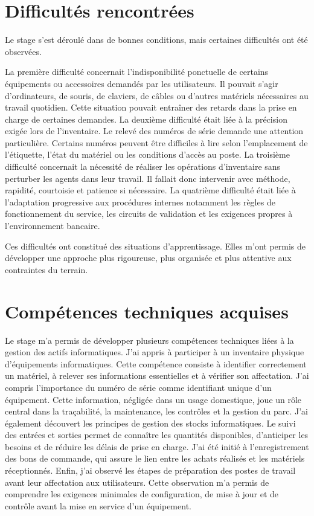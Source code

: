\documentclass[12pt,a4paper]{report}
\begin{document}
\section{Difficultés rencontrées}

Le stage s'est déroulé dans de bonnes conditions, mais certaines difficultés ont été observées.

La première difficulté concernait l'indisponibilité ponctuelle de certains équipements ou accessoires demandés par les utilisateurs. Il pouvait s'agir d'ordinateurs, de souris, de claviers, de câbles ou d'autres matériels nécessaires au travail quotidien. Cette situation pouvait entraîner des retards dans la prise en charge de certaines demandes.
La deuxième difficulté était liée à la précision exigée lors de l'inventaire. Le relevé des numéros de série demande une attention particulière. Certains numéros peuvent être difficiles à lire selon l'emplacement de l'étiquette, l'état du matériel ou les conditions d'accès au poste.
La troisième difficulté concernait la nécessité de réaliser les opérations d'inventaire sans perturber les agents dans leur travail. Il fallait donc intervenir avec méthode, rapidité, courtoisie et patience si nécessaire.
La quatrième difficulté était liée à l'adaptation progressive aux procédures internes notamment les règles de fonctionnement du service, les circuits de validation et les exigences propres à l'environnement bancaire.

Ces difficultés ont constitué des situations d'apprentissage. Elles m'ont permis de développer une approche plus rigoureuse, plus organisée et plus attentive aux contraintes du terrain.

\section{Compétences techniques acquises}

Le stage m'a permis de développer plusieurs compétences techniques liées à la gestion des actifs informatiques.
J'ai appris à participer à un inventaire physique d'équipements informatiques. Cette compétence consiste à identifier correctement un matériel, à relever ses informations essentielles et à vérifier son affectation.
J'ai compris l'importance du numéro de série comme identifiant unique d'un équipement. Cette information, négligée dans un usage domestique, joue un rôle central dans la traçabilité, la maintenance, les contrôles et la gestion du parc.
J'ai également découvert les principes de gestion des stocks informatiques. Le suivi des entrées et sorties permet de connaître les quantités disponibles, d'anticiper les besoins et de réduire les délais de prise en charge.
J'ai été initié à l'enregistrement des bons de commande, qui assure le lien entre les achats réalisés et les matériels réceptionnés.
Enfin, j'ai observé les étapes de préparation des postes de travail avant leur affectation aux utilisateurs. Cette observation m'a permis de comprendre les exigences minimales de configuration, de mise à jour et de contrôle avant la mise en service d'un équipement.
\end{document}
